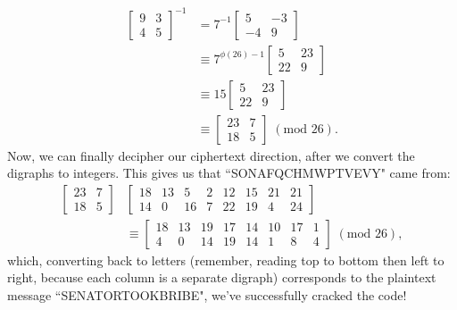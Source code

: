 \documentclass{article}
\begin{document}
\begin{align*}
    \begin{bmatrix}
        9 & 3 \\
        4 & 5
    \end{bmatrix}^{-1} &= 7^{-1} \begin{bmatrix}
        5 & -3 \\
        -4 & 9
    \end{bmatrix} \\
    &\equiv 7^{\phi(26) - 1} \begin{bmatrix}
        5 & 23 \\
        22 & 9
    \end{bmatrix} \\
    &\equiv 15 \begin{bmatrix}
        5 & 23 \\
        22 & 9
    \end{bmatrix} \\
    &\equiv \begin{bmatrix}
        23 & 7 \\
        18 & 5
    \end{bmatrix} \; (\text{mod } 26).
\end{align*}
Now, we can finally decipher our ciphertext direction, after we convert the digraphs to integers. This gives us that ``SONAFQCHMWPTVEVY" came from:
\begin{align*}
    \begin{bmatrix}
        23 & 7 \\
        18 & 5
    \end{bmatrix} & \begin{bmatrix}
        18 & 13 & 5 & 2 & 12 & 15 & 21 & 21 \\
        14 & 0 & 16 & 7 & 22 & 19 & 4  & 24
    \end{bmatrix} \\
    &\equiv \begin{bmatrix}
        18 & 13 & 19 & 17 & 14 & 10 & 17 & 1 \\
        4 & 0 & 14 & 19 & 14 & 1 & 8 & 4
    \end{bmatrix} \; (\text{mod } 26),
\end{align*}
which, converting back to letters (remember, reading top to bottom then left to right, because each column is a separate digraph) corresponds to the plaintext message ``SENATORTOOKBRIBE", we've successfully cracked the code!
\end{document}
